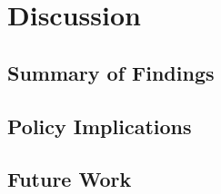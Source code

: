 \section{Discussion}
\subsection{Summary of Findings}


\subsection{Policy Implications}
\subsection{Future Work}







